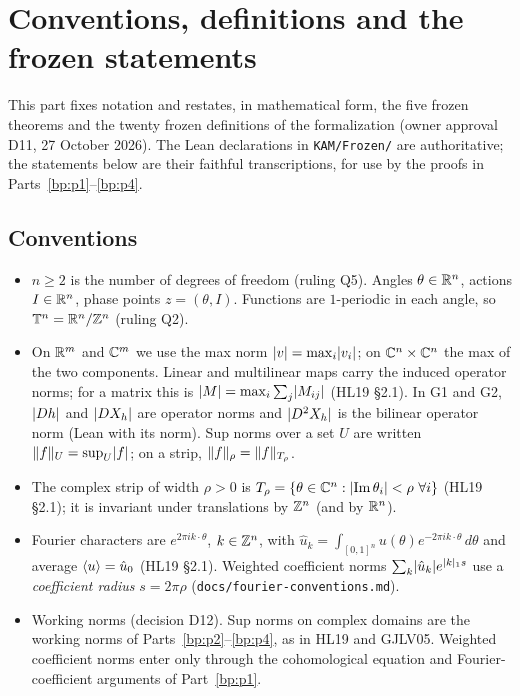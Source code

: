 \section{Conventions, definitions and the frozen statements}\label{bp:p0}

This part fixes notation and restates, in mathematical form, the five frozen theorems and the
twenty frozen definitions of the formalization (owner approval D11, 27 October 2026). The Lean
declarations in \texttt{KAM/Frozen/} are authoritative; the statements below are their faithful
transcriptions, for use by the proofs in Parts~\ref{bp:p1}--\ref{bp:p4}.

\subsection{Conventions}\label{bp:p0:conventions}

\begin{itemize}
\item $n\ge 2$ is the number of degrees of freedom (ruling Q5). Angles $\theta\in\mathbb{R}^n$, actions
  $I\in\mathbb{R}^n$, phase points $z=(\theta,I)$. Functions are $1$-periodic in each angle, so
  $\mathbb{T}^n=\mathbb{R}^n/\mathbb{Z}^n$ (ruling Q2).
\item On $\mathbb{R}^m$ and $\mathbb{C}^m$ we use the max norm $\lvert v\rvert=\max_i\lvert v_i\rvert$; on $\mathbb{C}^n\times\mathbb{C}^n$ the
  max of the two components. Linear and multilinear maps carry the induced operator norms; for a
  matrix this is $\lvert M\rvert=\max_i\sum_j\lvert M_{ij}\rvert$ (HL19 \S2.1). In G1 and G2, $\lvert Dh\rvert$ and $\lvert DX_h\rvert$ are
  operator norms and $\lvert D^2X_h\rvert$ is the bilinear operator norm (Lean  with its norm). Sup norms over a set $U$ are
  written $\lVert f\rVert_U=\sup_U\lvert f\rvert$; on a strip, $\lVert f\rVert_\rho=\lVert f\rVert_{T_\rho}$.
\item The complex strip of width $\rho>0$ is $T_\rho=\{\theta\in\C^n:\abs{\operatorname{Im}\theta_i}<\rho\ \forall i\}$
  (HL19 \S2.1); it is invariant under translations by $\mathbb{Z}^n$ (and by $\mathbb{R}^n$).
\item Fourier characters are $e^{2\pi i k\cdot\theta}$, $k\in\mathbb{Z}^n$, with $\hat u_k=\int_{[0,1]^n}u(\theta)e^{-2\pi ik\cdot\theta}\,d\theta$
  and average $\langle u\rangle=\hat u_0$ (HL19 \S2.1). Weighted coefficient norms
  $\sum_k\lvert \hat u_k\rvert e^{\lvert k\rvert_1 s}$ use a \emph{coefficient radius} $s=2\pi\rho$
  (\texttt{docs/fourier-conventions.md}).
\item Working norms (decision D12). Sup norms on complex domains are the working norms of
  Parts~\ref{bp:p2}--\ref{bp:p4}, as in HL19 and GJLV05. Weighted coefficient norms enter only
  through the cohomological equation and Fourier-coefficient arguments of Part~\ref{bp:p1}.
\end{itemize}

